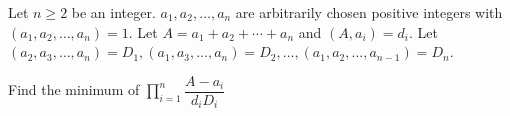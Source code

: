 Let $n\ge 2$ be an integer. $a_1,a_2,\dotsc,a_n$ are arbitrarily chosen positive integers with $(a_1,a_2,\dotsc,a_n)=1$. Let $A=a_1+a_2+\dotsb+a_n$ and $(A,a_i)=d_i$. Let $(a_2,a_3,\dotsc,a_n)=D_1, (a_1,a_3,\dotsc,a_n)=D_2,\dotsc, (a_1,a_2,\dotsc,a_{n-1})=D_n$.

Find the minimum of $\prod\limits_{i=1}^n\dfrac{A-a_i}{d_iD_i}$